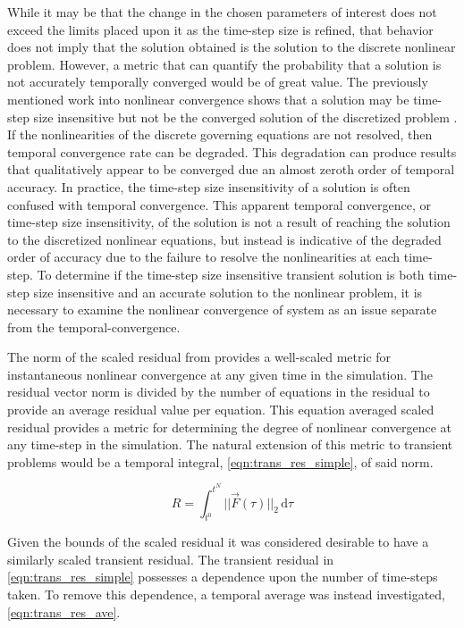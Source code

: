 While it may be that the change in the chosen parameters of interest does not exceed the limits placed upon it as the time-step size is refined, that behavior does not imply that the solution obtained is the solution to the discrete nonlinear problem.
However, a metric that can quantify the probability that a solution is not accurately temporally converged would be of great value.
The previously mentioned work into nonlinear convergence shows that a solution may be time-step size insensitive but not be the converged solution of the discretized problem \cite{Knoll2001}.
If the nonlinearities of the discrete governing equations are not resolved, then temporal convergence rate can be degraded.
This degradation can produce results that qualitatively appear to be converged due an almost zeroth order of temporal accuracy.
In practice, the time-step size insensitivity of a solution is often confused with temporal convergence.
This apparent temporal convergence, or time-step size insensitivity, of the solution is not a result of reaching the solution to the discretized nonlinear equations, but instead is indicative of the degraded order of accuracy due to the failure to resolve the nonlinearities at each time-step.
To determine if the time-step size insensitive transient solution is both time-step size insensitive and an accurate solution to the nonlinear problem, it is necessary to examine the nonlinear convergence of system as an issue separate from the temporal-convergence.

The norm of the scaled residual from  provides a well-scaled metric for instantaneous nonlinear convergence at any given time in the simulation.
The residual vector norm is divided by the number of equations in the residual to provide an average residual value per equation.
This equation averaged scaled residual provides a metric for determining the degree of nonlinear convergence at any time-step in the simulation.
The natural extension of this metric to transient problems would be a temporal integral, \eqref{eqn:trans_res_simple}, of said norm.

\begin{equation}
\label{eqn:trans_res_simple}
R = \int_{t^{0}}^{t^{N}} ||\vec{F}(\tau)||_2 \,\mathrm{d} \tau
\end{equation}

Given the bounds of the scaled residual it was considered desirable to have a similarly scaled transient residual.
The transient residual in \eqref{eqn:trans_res_simple} possesses a dependence upon the number of time-steps taken.
To remove this dependence, a temporal average was instead investigated, \eqref{eqn:trans_res_ave}.

